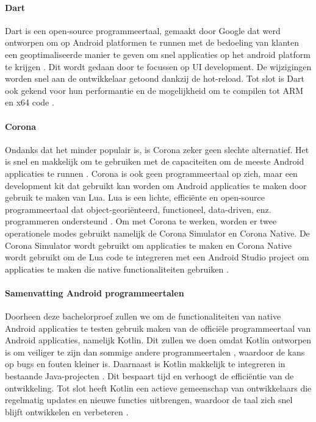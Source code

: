 \paragraph{Dart}
Dart is een open-source programmeertaal, gemaakt door Google dat werd ontworpen om op 
Android platformen te runnen \autocite{Kesavan2021} met de bedoeling van klanten een 
geoptimaliseerde manier te geven om snel applicaties op het android platform te krijgen 
\autocite{harkiran2022}. Dit wordt gedaan door te focussen op UI development. De wijzigingen 
worden snel aan de ontwikkelaar getoond dankzij de hot-reload. Tot slot is Dart ook gekend 
voor hun performantie en de mogelijkheid om te compilen tot ARM en x64 code \autocite{harkiran2022}.

\paragraph{Corona}
Ondanks dat het minder populair is, is Corona zeker geen slechte alternatief. Het is snel 
en makkelijk om te gebruiken met de capaciteiten om de meeste Android applicaties te runnen 
\autocite{Kesavan2021}. Corona is ook geen programmeertaal op zich, maar een development kit 
dat gebruikt kan worden om Android applicaties te maken door gebruik te maken van Lua. Lua is 
een lichte, efficiënte en open-source programmeertaal dat object-georiënteerd, functioneel, 
data-driven, enz. programmeren ondersteund \autocite{Lua2021}. Om met Corona te werken, worden 
er twee operationele modes gebruikt namelijk de Corona Simulator en Corona Native. De Corona 
Simulator wordt gebruikt om applicaties te maken en Corona Native wordt gebruikt om de Lua 
code te integreren met een Android Studio project om applicaties te maken die native 
functionaliteiten gebruiken \autocite{harkiran2022}.

\paragraph{Samenvatting Android programmeertalen}
Doorheen deze bachelorproef zullen we om de functionaliteiten van native Android applicaties 
te testen gebruik maken van de officiële programmeertaal van Android applicaties, 
namelijk Kotlin. Dit zullen we doen omdat Kotlin ontworpen is om veiliger te zijn dan 
sommige andere programmeertalen \autocite{Kesavan2021}, waardoor de kans op bugs en 
fouten kleiner is. Daarnaast is Kotlin makkelijk te integreren in bestaande 
Java-projecten \autocite{Kesavan2021}. Dit bespaart tijd en verhoogt de efficiëntie 
van de ontwikkeling. Tot slot heeft Kotlin een actieve gemeenschap van ontwikkelaars 
die regelmatig updates en nieuwe functies uitbrengen, waardoor de taal zich snel blijft 
ontwikkelen en verbeteren \autocite{Patel2023}.

